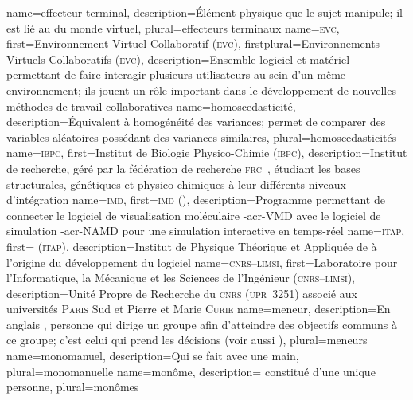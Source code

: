 {%
	name={effecteur terminal},%
	description={Élément physique que le sujet manipule; il est lié au  du monde virtuel},%
	plural={effecteurs terminaux}%
}
%
{%
	name={\textsc{evc}},%
	first={Environnement Virtuel Collaboratif (\textsc{evc})},%
	firstplural={Environnements Virtuels Collaboratifs (\textsc{evc})},%
	description={Ensemble logiciel et matériel permettant de faire interagir plusieurs utilisateurs au sein d'un même environnement; ils jouent un rôle important dans le développement de nouvelles méthodes de travail collaboratives}%
}
%
{%
	name={homoscedasticité},%
	description={Équivalent à homogénéité des variances; permet de comparer des variables aléatoires possédant des variances similaires},%
	plural={homoscedasticités}%
}
%
{%
	name={\textsc{ibpc}},%
	first={Institut de Biologie Physico-Chimie (\textsc{ibpc})},%
	description={Institut de recherche, géré par la fédération de recherche \textsc{frc}~, étudiant les bases structurales, génétiques et physico-chimiques à leur différents niveaux d'intégration}%
}
%
{%
	name={\textsc{imd}},%
	first={\textsc{imd} ()},%
	description={Programme permettant de connecter le logiciel de visualisation moléculaire \myacro-{acr-VMD} avec le logiciel de simulation \myacro-{acr-NAMD} pour une simulation interactive en temps-réel }%
}
%
{%
	name={\textsc{itap}},%
	first={ (\textsc{itap})},%
	description={Institut de Physique Théorique et Appliquée de  à l'origine du développement du logiciel }%
}
%
{%
	name={\textsc{cnrs--limsi}},%
	first={Laboratoire pour l'Informatique, la Mécanique et les Sciences de l'Ingénieur (\textsc{cnrs--limsi})},%
	description={Unité Propre de Recherche du \textsc{cnrs} (\textsc{upr}~3251) associé aux universités \textsc{Paris} Sud et Pierre et Marie \textsc{Curie}}%
}
%
{%
	name={meneur},%
	description={En anglais , personne qui dirige un groupe afin d'atteindre des objectifs communs à ce groupe; c'est celui qui prend les décisions (voir aussi )},%
	plural={meneurs}%
}
%
{%
	name={monomanuel},%
	description={Qui se fait avec une main},%
	plural={monomanuelle}%
}
%
{%
	name={monôme},%
	description={ constitué d'une unique personne},%
	plural={monômes}%
}
